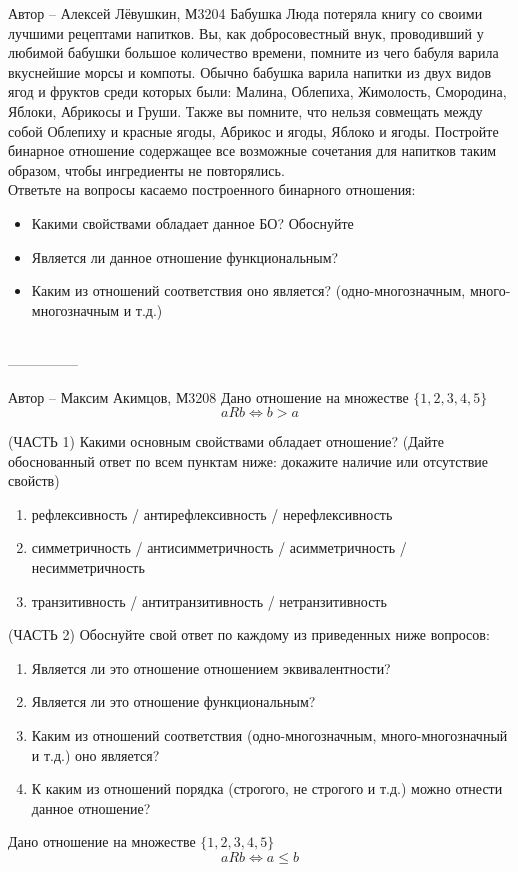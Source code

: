 \documentclass[10pt]{exam}
\begin{document}
\begin{questions}
Автор -- Алексей Лёвушкин, М3204\question
Бабушка Люда потеряла книгу со своими лучшими рецептами напитков. Вы, как добросовестный внук, проводивший у любимой бабушки большое количество времени, помните из чего бабуля варила вкуснейшие морсы и компоты. Обычно бабушка варила напитки из двух видов ягод и фруктов среди которых были: Малина, Облепиха, Жимолость, Смородина, Яблоки, Абрикосы и Груши. Также вы помните, что нельзя совмещать между собой Облепиху и красные ягоды, Абрикос и ягоды, Яблоко и ягоды. Постройте бинарное отношение содержащее все возможные сочетания для напитков таким образом, чтобы ингредиенты не повторялись.
\\
Ответьте на вопросы касаемо построенного бинарного отношения:
\begin{itemize}
    \item Какими свойствами обладает данное БО? Обоснуйте
    \item Является ли данное отношение функциональным?
    \item Каким из отношений соответствия оно является? (одно-многозначным, много-многозначным и т.д.)
\end{itemize}
\\
---------------

Автор -- Максим Акимцов, М3208\question
Дано отношение на множестве $\{1, 2, 3, 4, 5\}$ 
\begin{equation*}
	aRb \iff b > a
\end{equation*}

(ЧАСТЬ 1) Какими основным свойствами обладает отношение? (Дайте обоснованный ответ по всем пунктам ниже: докажите наличие или отсутствие свойств)  
\begin{enumerate}
	\renewcommand{\labelenumi}{\alph{enumi})}
	\item рефлексивность / антирефлексивность / нерефлексивность
	\item симметричность / антисимметричность / асимметричность / несимметричность
	\item транзитивность / антитранзитивность / нетранзитивность
\end{enumerate}

(ЧАСТЬ 2) Обоснуйте свой ответ по каждому из приведенных ниже вопросов:
\begin{enumerate}
	\renewcommand{\labelenumi}{\alph{enumi})}
    \item Является ли это отношение отношением эквивалентности?
    \item Является ли это отношение функциональным?
    \item Каким из отношений соответствия (одно-многозначным, много-многозначный и т.д.) оно является?
    \item К каким из отношений порядка (строгого, не строгого и т.д.) можно отнести данное отношение?
\end{enumerate}
\question
Дано отношение на множестве $\{1, 2, 3, 4, 5\}$ 
\begin{equation*}
	aRb \iff a \leqslant b
\end{equation*}


\end{questions}
\end{document}

